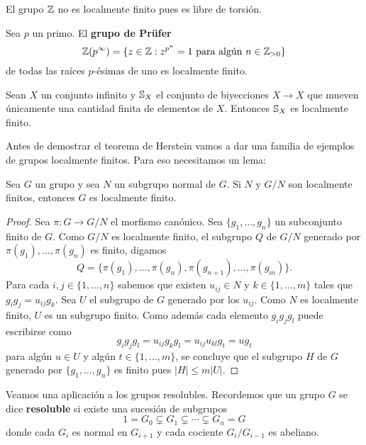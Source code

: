 \begin{example}
	El grupo $\mathbb{Z}$ no es localmente finito pues es libre de torsión.
\end{example}

\begin{example}
	Sea $p$ un primo.  El \textbf{grupo de Pr\"ufer}
	\[
		\mathbb{Z}(p^{\infty})=\{z\in\mathbb{Z}:z^{p^n}=1\text{ para algún $n\in\mathbb{Z}_{>0}$}\}
	\]
	de todas
	las raíces $p$-ésimas de uno es localmente finito.
\end{example}

\begin{example}
	Sean $X$ un conjunto infinito y $\mathbb{S}_X$ el conjunto de biyecciones $X\to
	X$ que mueven únicamente una cantidad finita de elementos de $X$. Entonces
	$\mathbb{S}_X$ es localmente finito.
\end{example}

Antes de demostrar el teorema de Herstein vamos a dar una familia de ejemplos
de grupos localmente finitos. Para eso necesitamos un lema:

\begin{lemma}
	\label{lem:solvable_torsion=>lf}
	Sea $G$ un grupo y sea $N$ un subgrupo normal de $G$. Si $N$ y $G/N$ son
	localmente finitos, entonces $G$ es localmente finito.
\end{lemma}

\begin{proof}
	Sea $\pi\colon G\to G/N$ el morfismo canónico. Sea $\{g_1,\dots,g_n\}$ un
	subconjunto finito de $G$. Como $G/N$ es localmente finito, el subgrupo $Q$
	de $G/N$ generado por $\pi(g_1),\dots,\pi(g_n)$ es finito, digamos
	\[
		Q=\{\pi(g_1),\dots,\pi(g_n),\pi(g_{n+1}),\dots,\pi(g_m)\}.
	\]
	Para cada $i,j\in\{1,\dots,n\}$ sabemos que existen $u_{ij}\in N$ y
	$k\in\{1,\dots,m\}$ tales que $g_ig_j=u_{ij}g_k$. Sea $U$ el subgrupo de
	$G$ generado por los $u_{ij}$. Como $N$ es localmente finito, $U$ es un
	subgrupo finito. Como además cada elemento $g_ig_jg_l$ puede escribirse como
	\[
		g_ig_jg_l=u_{ij}g_kg_l=u_{ij}u_{kl}g_t=ug_t
	\]
	para algún $u\in U$ y algún $t\in\{1,\dots,m\}$, se concluye que el
	subgrupo $H$ de $G$ generado por $\{g_1,\dots,g_n\}$ es finito pues
	$|H|\leq m|U|$. 
\end{proof}

Veamos una aplicación a los grupos resolubles. Recordemos que un grupo $G$ se
dice \textbf{resoluble} si existe una sucesión de subgrupos 
\begin{equation}
	\label{eq:resoluble}
	1=G_0\subsetneq G_1\subsetneq \cdots\subsetneq G_n=G
\end{equation}
donde cada $G_i$ es normal en $G_{i+1}$ y cada cociente $G_i/G_{i-1}$ es
abeliano.

